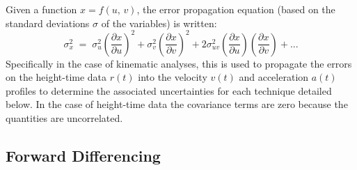 \documentclass[namedreferences]{SolarPhysics}
\begin{document}
\begin{article}
Given a function $x=f(u,\,v)$, the error propagation equation (based on the standard deviations $\sigma$ of the variables) is written:
\begin{equation}
\label{eqn_errorprop}
\sigma_x^2 \; = \; \sigma_u^2 \left(\frac{\partial x}{\partial u}\right) ^2 + \sigma_v^2 \left( \frac{\partial x}{\partial v} \right) ^2 + 2 \sigma_{uv}^2 \left( \frac{\partial x}{\partial u} \right) \left( \frac{\partial x}{\partial v} \right) + ...
\end{equation}
Specifically in the case of kinematic analyses, this is used to propagate the errors on the height-time data $r(t)$ into the velocity $v(t)$ and acceleration $a(t)$ profiles to determine the associated uncertainties for each technique detailed below. In the case of height-time data the covariance terms are zero because the quantities are uncorrelated.

\subsection{Forward Differencing} %
\label{sect_forward}


\end{article}
\end{document}
